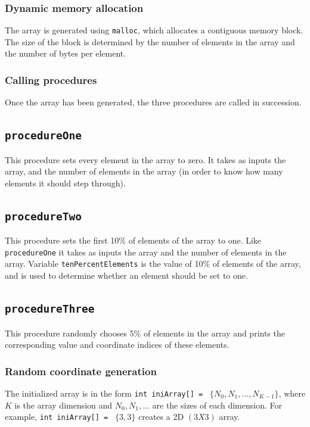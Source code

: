 \documentclass[10pt, conference]{IEEEtran}
\begin{document}
\subsubsection{Dynamic memory allocation}
The array is generated using \texttt{malloc}, which allocates a contiguous memory block. The size of the block is determined by the number of elements in the array and the number of bytes per element.
\subsubsection{Calling procedures}
Once the array has been generated, the three procedures are called in succession.

\subsection{\texttt{procedureOne}}
This procedure sets every element in the array to zero. It takes as inputs the array, and the number of elements in the array (in order to know how many elements it should step through).

\subsection{\texttt{procedureTwo}}
This procedure sets the first 10\% of elements of the array to one. Like \texttt{procedureOne} it takes as inputs the array and the number of elements in the array. Variable \texttt{tenPercentElements} is the value of 10\% of elements of the array, and is used to determine whether an element should be set to one.

\subsection{\texttt{procedureThree}}
This procedure randomly chooses 5\% of elements in the array and prints the corresponding value and coordinate indices of these elements.
\subsubsection{Random coordinate generation}
The initialized array is in the form  \texttt{int iniArray[] = } $\{N_0 , N_1 , ... , N_{K-1} \}$, where $K$ is the array dimension and $N_0 , N_1 , ...$ are the sizes of each dimension. For example, \texttt{int iniArray[] = } $\{3 , 3 \}$ creates a 2D $(3 X 3)$ array.\newline\newline
\end{document}
